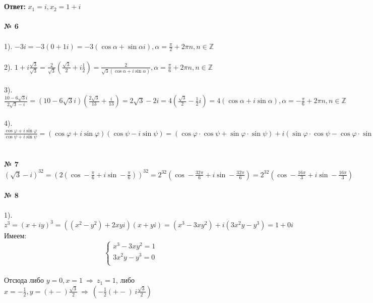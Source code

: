 \documentclass[a4paper, 12pt]{article}
\begin{document}
    \\
    \\ \textbf{Ответ: } $x_1 = i, x_2 = 1 + i$
    \\
    \\ \textbf{№ 6}
    \\
    \\ 1). $-3i = -3(0 + 1i) = -3(\cos \alpha + \sin \alpha i), \alpha = \frac{\pi }{2} + 2 \pi n, n \in \mathbb{Z}$
    \\
    \\ 2). $1 + i\frac{\sqrt{3}}{\sqrt{3}} = \frac{2}{\sqrt{3}}(\frac{\sqrt{3}}{2} + i\frac{1}{2}) = \frac{2}{\sqrt{3}(\cos \alpha + i \sin \alpha)}, \alpha = \frac{\pi }{6} + 2 \pi n, n \in \mathbb{Z}$
    \\
    \\ 3). $\frac{10 - 6\sqrt{3} i}{2\sqrt{3} - i} = (10 - 6\sqrt{3} i)(\frac{2\sqrt{3}}{13} + \frac{i}{13}) = 2 \sqrt{3} - 2 i = 4(\frac{\sqrt{3}}{2} - \frac{1}{2}i) = 4(\cos \alpha + i \sin \alpha), \alpha = -\frac{\pi }{6} + 2\pi n, n \in \mathbb{Z}$
    \\
    \\ 4). $\frac{\cos \varphi + i \sin \varphi}{\cos \psi + i \sin \psi} = (\cos \varphi + i \sin \varphi)(\cos \psi - i \sin \psi) = (\cos \varphi \cdot \cos \psi + \sin \varphi \cdot \sin \psi) + i (\sin \varphi \cdot \cos \psi - \cos \varphi \cdot \sin \psi) = \cos (\varphi - \psi) + i \sin (\varphi - \psi)$
    \\
    \\
    \\ \textbf{№ 7} $(\sqrt{3} - i)^{32} = (2(\cos -\frac{\pi}{6} + i \sin -\frac{\pi}{6}))^{32} = 2^{32}(\cos -\frac{32 \pi}{6} + i \sin -\frac{32 \pi}{6}) = 2^{32}(\cos -\frac{16 \pi}{3} + i \sin -\frac{16 \pi}{3})$
    \\
    \\ \textbf{№ 8}
    \\
    \\ 1). $z^3 = (x + iy)^3 = ((x^2 - y^2) + 2xy i)(x + y i) = (x^3 - 3xy^2) + i (3x^2y - y^3) = 1 + 0 i$
    \\ Имеем:
    \begin{equation*}
        \begin{cases}
            x^3 - 3xy^2 = 1 \\
            3x^2y - y^3 = 0 \\
        \end{cases}
    \end{equation*}
    \\ Отсюда либо $y = 0, x = 1 \ \Rightarrow \ z_1 = 1$, либо $x = -\frac{1}{2}, y = (+-) \frac{\sqrt{3}}{2} \ \Rightarrow \ (-\frac{1}{2} (+-) \ i \frac{\sqrt{3}}{2})$
\end{document}

